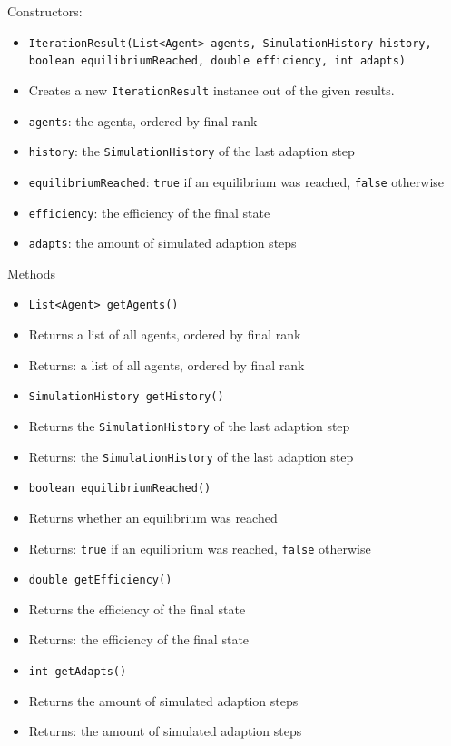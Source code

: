\documentclass[parskip=full,11pt]{scrartcl}
\begin{document}
Constructors:
\begin{itemize}\itemsep -10pt
\item \texttt{IterationResult(List<Agent> agents, SimulationHistory history, boolean equilibriumReached, double efficiency, int adapts)}
\item[] Creates a new \texttt{IterationResult} instance out of the given results.
\item[] \texttt{agents}: the agents, ordered by final rank
\item[] \texttt{history}: the \texttt{SimulationHistory} of the last adaption step
\item[] \texttt{equilibriumReached}: \texttt{true} if an equilibrium was reached, \texttt{false} otherwise
\item[] \texttt{efficiency}: the efficiency of the final state
\item[] \texttt{adapts}: the amount of simulated adaption steps
\end{itemize}
\newpage
Methods
\begin{itemize}\itemsep -10pt
\item \texttt{List<Agent> getAgents()}
\item[] Returns a list of all agents, ordered by final rank
\item[] Returns: a list of all agents, ordered by final rank

\item \texttt{SimulationHistory getHistory()}
\item[] Returns the \texttt{SimulationHistory} of the last adaption step
\item[] Returns: the \texttt{SimulationHistory} of the last adaption step

\item \texttt{boolean equilibriumReached()}
\item[] Returns whether an equilibrium was reached
\item[] Returns: \texttt{true} if an equilibrium was reached, \texttt{false} otherwise

\item \texttt{double getEfficiency()}
\item[] Returns the efficiency of the final state
\item[] Returns: the efficiency of the final state

\item \texttt{int getAdapts()}
\item[] Returns the amount of simulated adaption steps
\item[] Returns: the amount of simulated adaption steps
\end{itemize}
\end{document}
